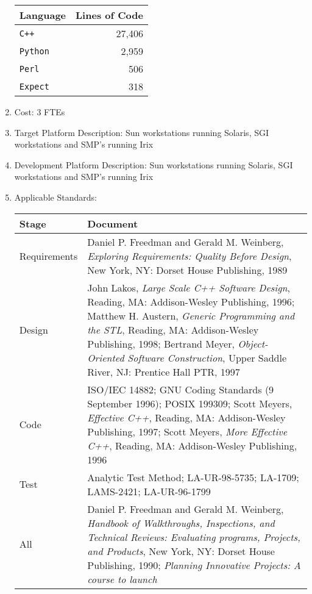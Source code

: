 \begin{enumerate}
\begin{center}
\begin{tabular}{l|r}
Language & Lines of Code \\ \hline
{\tt C++} & 27,406 \\
{\tt Python} & 2,959 \\
{\tt Perl} & 506 \\
{\tt Expect} & 318
\end{tabular}
\end{center}
\item Cost: 3 FTEs
\item Target Platform Description: Sun workstations running Solaris,
SGI workstations and SMP's running Irix
\item Development Platform Description: Sun workstations running Solaris,
SGI workstations and SMP's running Irix
\item Applicable Standards:
\begin{center}
\begin{tabular}{l|p{3in}}
Stage & Document \\ \hline
Requirements & Daniel P. Freedman and Gerald M. Weinberg, {\em
              Exploring Requirements: Quality Before Design}, New
              York, NY: Dorset House Publishing, 1989\\ 
Design      & John Lakos, {\em Large Scale C++ Software Design},
              Reading, MA: Addison-Wesley Publishing, 1996;
              Matthew H. Austern, {\em Generic Programming and the
              STL}, Reading, MA: Addison-Wesley Publishing, 1998;
              Bertrand Meyer, {\em Object-Oriented Software
              Construction}, Upper Saddle River, NJ: Prentice Hall
	      PTR, 1997\\
Code        & ISO/IEC 14882; GNU Coding Standards (9 September 1996); 
	      POSIX 199309; Scott Meyers, {\em Effective C++},
              Reading, MA: Addison-Wesley Publishing, 1997; Scott
              Meyers, {\em More Effective C++}, Reading, MA:
              Addison-Wesley Publishing, 1996 \\
Test        & Analytic Test Method; LA-UR-98-5735; LA-1709; LAMS-2421;
              LA-UR-96-1799 \\ 
All         & Daniel P. Freedman and Gerald M. Weinberg, {\em Handbook
              of Walkthroughs, Inspections, and Technical Reviews:
              Evaluating programs, Projects, and Products}, New
              York, NY: Dorset House Publishing, 1990;
              {\em Planning Innovative Projects: A course to launch
}
\end{tabular}
\end{center}
\end{enumerate}
